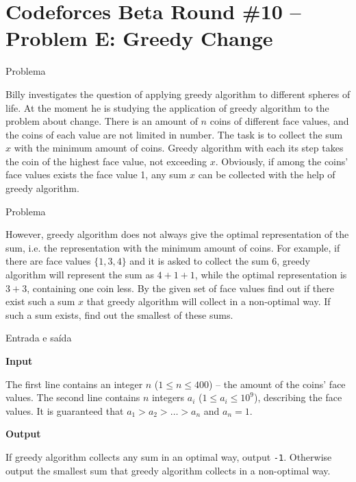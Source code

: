 \section{Codeforces Beta Round \#10 -- Problem E: Greedy Change}

\begin{frame}[fragile]{Problema}

Billy investigates the question of applying greedy algorithm to different spheres of life. At the
moment he is studying the application of greedy algorithm to the problem about change. There is an
amount of $n$ coins of different face values, and the coins of each value are not limited in
number. The task is to collect the sum $x$ with the minimum amount of coins. Greedy algorithm with
each its step takes the coin of the highest face value, not exceeding $x$. Obviously, if among the
coins' face values exists the face value 1, any sum $x$ can be collected with the help of greedy
algorithm.

\end{frame}


\begin{frame}[fragile]{Problema}

However, greedy algorithm does not always give the optimal representation of the sum, i.e. the
representation with the minimum amount of coins. For example, if there are face values
$\{1, 3, 4\}$ and it is asked to collect the sum $6$, greedy algorithm will represent the sum as 
$4 + 1 + 1$, while the optimal representation is $3 + 3$, containing one coin less. By the given
set of face values find out if there exist such a sum $x$ that greedy algorithm will collect in a
non-optimal way. If such a sum exists, find out the smallest of these sums.

\end{frame}

\begin{frame}[fragile]{Entrada e saída}

\textbf{Input}

The first line contains an integer $n$ ($1\leq n\leq 400$) -- the amount of the coins' face values.
The second line contains $n$ integers $a_i$ ($1\leq a_i\leq 10^9$), describing the face values. It
is guaranteed that $a_1 > a_2 > \ldots > a_n$ and $a_n = 1$.

\vspace{0.2in}

\textbf{Output}

If greedy algorithm collects any sum in an optimal way, output \texttt{-1}. Otherwise output the
smallest sum that greedy algorithm collects in a non-optimal way.

\end{frame}

